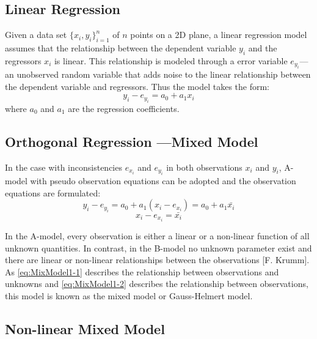 \subsection{Linear Regression}
\label{subsec:LinearRegression}

Given a data set $\{x_i,y_i\}^n_{i=1}$ of $n$ points on a 2D plane, a linear regression model assumes that the relationship between the dependent variable $y_i$ and the regressors $x_i$ is linear. This relationship is modeled through a error variable $e_{y_i}$--- an unobserved random variable that adds noise to the linear relationship between the dependent variable and regressors.
Thus the model takes the form:
\begin{equation} \label{eq:SimpleLinearRegression}
y_i - e_{y_i} = a_0 + a_1x_i
\end{equation}
where $a_0$ and $a_1$ are the regression coefficients.


\subsection{Orthogonal Regression ---Mixed Model}
\label{subsec:MixedModel}

In the case with inconsistencies $e_{x_i}$ and $e_{y_i}$ in both observations $x_i$ and $y_i$, A-model with pseudo observation equations can be adopted and the observation equations are formulated:
\begin{equation} \label{eq:MixModel1-1}
y_i - e_{y_i} = a_0 + a_1(x_i-e_{x_i}) = a_0 + a_1\bar{x_i}
\end{equation}
\begin{equation} \label{eq:MixModel1-2}
x_i-e_{x_i} = \bar{x_i}
\end{equation}

In the A-model, every observation is either a linear or a non-linear function of all unknown quantities. In contrast, in the B-model no unknown parameter exist and there are linear or non-linear relationships between the observations [F. Krumm]. As \eqref{eq:MixModel1-1} describes the relationship between observations and unknowns and \eqref{eq:MixModel1-2} describes the relationship between observations, this model is known as the mixed model or Gauss-Helmert model.




\subsection{Non-linear Mixed Model}
\label{subsec:NonLinear}

